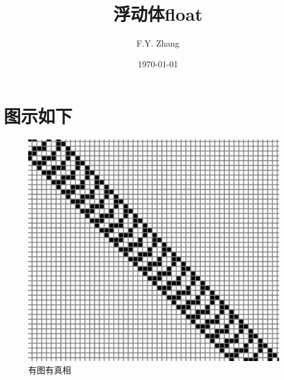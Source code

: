 \documentclass{ctexart}
\title{浮动体float}
\author{F.Y. Zhang}
\date{\today}
\begin{document}
\maketitle
\section{图示如下}
\begin{figure}[htbp]
\centering
\includegraphics{highway.png}
\caption{有图有真相}
\label{fig:myphoto}
\end{figure}
\end{document}
